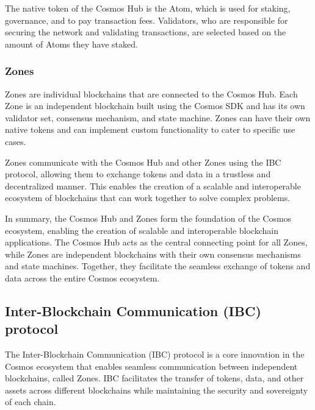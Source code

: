 \documentclass{article}
\begin{document}
The native token of the Cosmos Hub is the Atom, which is used for staking, governance, and to pay transaction fees. Validators, who are responsible for securing the network and validating transactions, are selected based on the amount of Atoms they have staked.

\subsubsection{Zones}

Zones are individual blockchains that are connected to the Cosmos Hub. Each Zone is an independent blockchain built using the Cosmos SDK and has its own validator set, consensus mechanism, and state machine. Zones can have their own native tokens and can implement custom functionality to cater to specific use cases.

Zones communicate with the Cosmos Hub and other Zones using the IBC protocol, allowing them to exchange tokens and data in a trustless and decentralized manner. This enables the creation of a scalable and interoperable ecosystem of blockchains that can work together to solve complex problems.

In summary, the Cosmos Hub and Zones form the foundation of the Cosmos ecosystem, enabling the creation of scalable and interoperable blockchain applications. The Cosmos Hub acts as the central connecting point for all Zones, while Zones are independent blockchains with their own consensus mechanisms and state machines. Together, they facilitate the seamless exchange of tokens and data across the entire Cosmos ecosystem.
%
%
\subsection{Inter-Blockchain Communication (IBC) protocol}
%
The Inter-Blockchain Communication (IBC) protocol is a core innovation in the Cosmos ecosystem that enables seamless communication between independent blockchains, called Zones. IBC facilitates the transfer of tokens, data, and other assets across different blockchains while maintaining the security and sovereignty of each chain.
%
\end{document}
